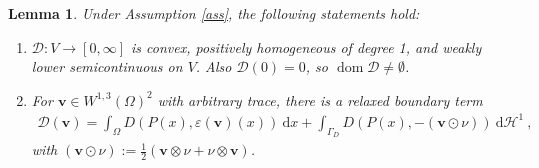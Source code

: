 \documentclass{article}
\newtheorem{lemma}[theorem]{Lemma}
\theoremstyle{definition}
\newcommand{\bfv}{\boldsymbol{v}}
\newcommand{\D}{\mathcal{D}}
\newcommand{\dd}{\:\mathrm{d}}
\DeclareMathOperator{\dom}{dom}
\begin{document}
\begin{lemma} \label{lem:bdd}
    Under Assumption \ref{ass}, the following statements hold:
    \begin{enumerate}
        \item $\D : V \rightarrow [0,\infty]$ is convex, positively homogeneous of degree 1, and weakly lower semicontinuous on $V$. Also $\D (0)=0$, so $\dom \D \neq \emptyset$.
        \item
        For $\bfv \in W^{1,3}(\Omega)^2$ with arbitrary trace, there is a relaxed
        boundary term
        \begin{align}
            \D (\bfv) = \int_\Omega D(P(x),\varepsilon(\bfv)(x)) \dd x + \int_{\Gamma_D} D(P(x), -(\bfv\odot \nu) ) \dd \mathcal{H}^1 \ , \label{eq:int_darstellung}
        \end{align}
        with $(\bfv \odot \nu) := \frac{1}{2}(\bfv \otimes \nu + \nu \otimes \bfv)$.
    \end{enumerate}
\end{lemma}
\end{document}
